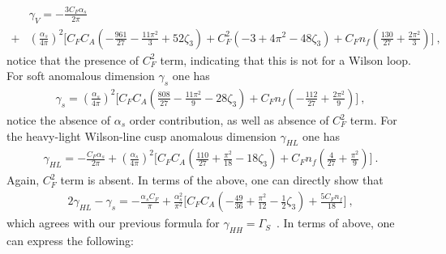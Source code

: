 \documentclass[a4paper,11pt]{article}
\begin{document}
 \begin{align}
 &\gamma_V=-\frac{3C_F\alpha_s}{2\pi} \nonumber \\ +&\left(\frac{\alpha_s}{4\pi}\right)^2\bigg[C_FC_A\left(-\frac{961}{27}-\frac{11\pi^2}{3}+52\zeta_3\right)+C_F^2\left(-3+4\pi^2-48\zeta_3\right)+C_Fn_f\left(\frac{130}{27}+\frac{2\pi^2}{3}\right)\bigg] \ ,
 \end{align}
 notice that the presence of $C_F^2$ term, indicating that this is not for a Wilson loop. For soft anomalous dimension $\gamma_s$ one has~\cite{Korchemskaya:1992je}
 \begin{align}
\gamma_s=\left(\frac{\alpha_s}{4\pi}\right)^2\bigg[C_FC_A\left(\frac{808}{27}-\frac{11\pi^2}{9}-28\zeta_3\right)+C_Fn_f\left(-\frac{112}{27}+\frac{2\pi^2}{9}\right)\bigg] \ ,
\end{align}
notice the absence of $\alpha_s$ order contribution, as well as absence of $C_F^2$ term. For the heavy-light Wilson-line cusp anomalous dimension $\gamma_{HL}$ one has~\cite{Korchemsky:1992xv}
\begin{align}
\gamma_{HL}=-\frac{C_F\alpha_s}{2\pi}+\left(\frac{\alpha_s}{4\pi}\right)^2\bigg[C_FC_A\left(\frac{110}{27}+\frac{\pi^2}{18}-18\zeta_3\right)+C_Fn_f\left(\frac{4}{27}+\frac{\pi^2}{9}\right)\bigg] \ .
\end{align}
Again, $C_F^2$ term is absent. In terms of the above, one can directly show that
\begin{align}
2\gamma_{HL}-\gamma_s=-\frac{\alpha_sC_F}{\pi}+\frac{\alpha_s^2}{\pi^2}\bigg[C_FC_A\left(-\frac{49}{36}+\frac{\pi^2}{12}-\frac{1}{2}\zeta_3\right)+\frac{5C_Fn_f}{18}\bigg] \ ,
\end{align}
which agrees with our previous formula for $\gamma_{HH}=\Gamma_{S}$~\cite{Ji:2019ewn,Ji:2020ect,Ji:2021znw}.  In terms of above, one can express the following:
\end{document}
